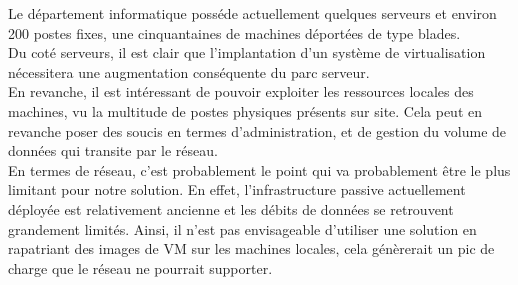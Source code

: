 Le département informatique posséde actuellement quelques serveurs et environ 200 postes fixes, une cinquantaines de machines déportées de type blades.\\
Du coté serveurs, il est clair que l'implantation d'un système de virtualisation nécessitera une augmentation conséquente du parc serveur.\\
En revanche, il est intéressant de pouvoir exploiter les ressources locales des machines, vu la multitude de postes physiques présents sur site. Cela peut en revanche poser des soucis en termes d'administration, et de gestion du volume de données qui transite par le réseau.\\
En termes de réseau, c'est probablement le point qui va probablement être le plus limitant pour notre solution. En effet, l'infrastructure passive actuellement déployée est relativement ancienne et les débits de données se retrouvent grandement limités. Ainsi, il n'est pas envisageable d'utiliser une solution en rapatriant des images de VM sur les machines locales, cela génèrerait un pic de charge que le réseau ne pourrait supporter.\\


